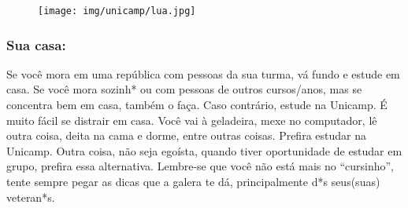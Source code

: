 
\begin{figure}[h!]  \centering
  \texttt{[image: img/unicamp/lua.jpg]}
\end{figure}

\subsubsection{Sua casa:} Se você mora em uma república com pessoas da sua
turma, vá fundo e estude em casa. Se você mora sozinh* ou com pessoas de
outros cursos/anos, mas se concentra bem em casa, também o faça. Caso
contrário, estude na Unicamp. É muito fácil se distrair em casa. Você vai à
geladeira, mexe no computador, lê outra coisa, deita na cama e dorme, entre
outras coisas. Prefira estudar na Unicamp. Outra coisa, não seja egoísta,
quando tiver oportunidade de estudar em grupo, prefira essa alternativa.
Lembre-se que você não está mais no ``cursinho'', tente sempre pegar as dicas
que a galera te dá, principalmente d*s seus(suas) veteran*s.
